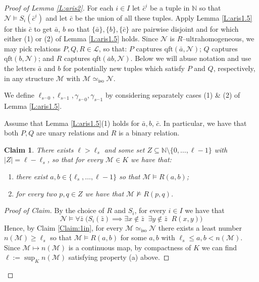 \documentclass[11pt]{amsart}
\theoremstyle{plain}
\newtheorem{claim}[theorem]{Claim}
\theoremstyle{definition}
\begin{document}
\begin{proof}[Proof of Lemma \ref{L:aris2}]
For each $i\in I$ let $\bar{c}^i$ be a tuple in $\mathbb{N}$ so that $\mathcal{N}\models S_i(\bar{c}^i)$ and let $\bar{c}$ be the union of all these tuples. Apply Lemma \ref{L:aris1.5} for this $\bar{c}$ to get $\bar{a}$,  $b$ so that $\{\bar{a}\}, \{b\}, \{\bar{c}\}$ are pairwise disjoint and for which either (1) or (2) of Lemma \ref{L:aris1.5} holds.  Since $\mathcal{N}$ is $R$--ultrahomogeneous, we may  pick  relations $P,Q,R\in \mathcal{L}$, so that: $P$ captures $\mathrm{qft}(\bar{a},\mathcal{N})$; $Q$ captures $\mathrm{qft}(b,\mathcal{N})$; and $R$ captures $\mathrm{qft}(\bar{a}b,\mathcal{N})$.
Below we will abuse notation and use the letters 
$\bar{a}$ and $b$ for potentially new tuples which satisfy  $P$ and $Q$, respectively, in any structure $\mathcal{M}$ with $\mathcal{M}\simeq_{\mathrm{iso}}\mathcal{N}$.

We define $\ell_{s^{\frown}0}, \ell_{s^{\frown}1},\gamma_{s^{\frown}0},\gamma_{s^{\frown}1}$ by considering separately cases (1) \& (2) of Lemma \ref{L:aris1.5}.




\medskip{}

 Assume that Lemma \ref{L:aris1.5}(1) holds for $\bar{a}, b$,  $\bar{c}$. In particular, we have that both $P,Q$ are unary  relations and $R$ is a binary relation.

\begin{claim}
There exists $\ell>\ell_s$ and some set $Z\subseteq \mathbb{N}\setminus \{0,\ldots,\ell-1\}$ with $|Z|=\ell-\ell_s$, so that for every $\mathcal{M}\in K$ we have that:
\begin{enumerate}
    \item[(a)] there exist $a,b\in \{\ell_s,\ldots,\ell-1\}$ so that $\mathcal{M}\models R(a,b)$;
    \item[(b)] for every two $p,q\in Z$  we have that  $\mathcal{M}\not\models R(p,q)$.
\end{enumerate}
\end{claim}
\begin{proof}[Proof of Claim]
By the choice of $R$ and $S_i$, for every $i\in I$ we have that 
\[\mathcal{N}\models \forall \bar{z}  \;\big(  S_i(\bar{z})  \implies \exists x \not \in \bar{z}  \;
\;\exists y\not \in \bar{z}  \; \;  R(x,y)\big)\]
Hence, by Claim \ref{Claim:1in}, for every $\mathcal{M}\simeq_{\mathrm{iso}}\mathcal{N}$ there exists a least number $n(\mathcal{M})\geq \ell_s$ so that  $\mathcal{M}\models R(a,b)$ for some  $a,b$ with $\ell_s\leq a,b <n(\mathcal{M})$. Since $\mathcal{M}\mapsto n(\mathcal{M})$ is a continuous map, by compactness of $K$ we can find $\ell:=\sup_K n(\mathcal{M})$ satisfying property (a) above.



\end{proof}
\end{proof}
\end{document}
